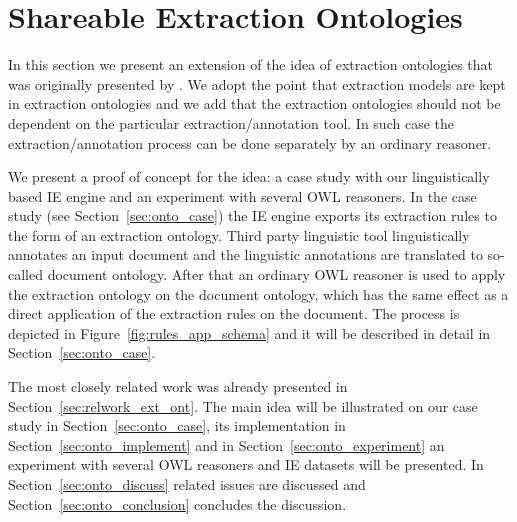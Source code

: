 


\section{Shareable Extraction Ontologies} \label{sec:onto_extraction_ontologies}
\graphicspath{{../img/ch70/}}

In this section we present an extension of the idea of extraction ontologies that was originally presented by \cite{DBLP:conf/er/EmbleyTL02}. We adopt the point that extraction models are kept in extraction ontologies and we add that the extraction ontologies should not be dependent on the particular extraction/annotation tool. In such case the extraction/annotation process can be done separately by an ordinary reasoner.


We present a proof of concept for the idea: a case study with our linguistically based IE engine and an experiment with several OWL reasoners. In the case study (see Section~\ref{sec:onto_case}) the IE engine exports its extraction rules to the form of an extraction ontology. Third party linguistic tool linguistically annotates an input document and the linguistic annotations are translated to so-called document ontology. After that an ordinary OWL reasoner is used to apply the extraction ontology on the document ontology, which has the same effect as a direct application of the extraction rules on the document. The process is depicted in Figure~\ref{fig:rules_app_schema} and it will be described in detail in Section~\ref{sec:onto_case}.



The most closely related work was already presented in Section~\ref{sec:relwork_ext_ont}. The main idea will be illustrated on our case study in Section~\ref{sec:onto_case}, its implementation in Section~\ref{sec:onto_implement} and in Section~\ref{sec:onto_experiment} an experiment with several OWL reasoners and IE datasets will be presented. In Section~\ref{sec:onto_discuss} related issues are discussed and Section~\ref{sec:onto_conclusion} concludes the discussion.

\pagebreak


